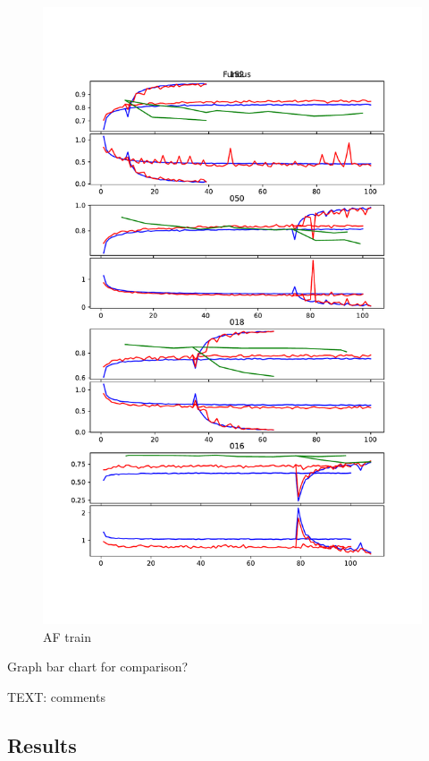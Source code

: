 \documentclass{article}
\begin{document}
			\begin{figure}[htbp]
				\centering
				\includegraphics[width=\linewidth]{Figs/abnormity_Fundus_loss_and_acc.pdf}
				\caption{AF train}
				\vspace{0.3cm}
				\label{fig:AF_train}
			\end{figure}
			
			Graph bar chart for comparison? 
			
			TEXT: comments
			
		\subsection{Results}
			
\end{document}
